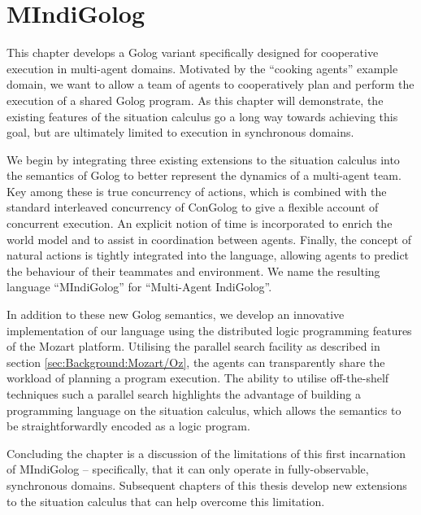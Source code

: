 

\chapter{MIndiGolog}

\label{ch:mindigolog}

This chapter develops a Golog variant specifically designed for cooperative
execution in multi-agent domains. Motivated by the {}``cooking agents''
example domain, we want to allow a team of agents to cooperatively
plan and perform the execution of a shared Golog program. As this
chapter will demonstrate, the existing features of the situation calculus
go a long way towards achieving this goal, but are ultimately limited
to execution in synchronous domains.

We begin by integrating three existing extensions to the situation
calculus into the semantics of Golog to better represent the dynamics
of a multi-agent team. Key among these is true concurrency of actions,
which is combined with the standard interleaved concurrency of ConGolog
to give a flexible account of concurrent execution. An explicit notion
of time is incorporated to enrich the world model and to assist in
coordination between agents. Finally, the concept of natural actions
is tightly integrated into the language, allowing agents to predict
the behaviour of their teammates and environment. We name the resulting
language {}``MIndiGolog'' for {}``Multi-Agent IndiGolog''.

In addition to these new Golog semantics, we develop an innovative
implementation of our language using the distributed logic programming
features of the Mozart platform. Utilising the parallel search facility
as described in section \ref{sec:Background:Mozart/Oz}, the agents
can transparently share the workload of planning a program execution.
The ability to utilise off-the-shelf techniques such a parallel search
highlights the advantage of building a programming language on the
situation calculus, which allows the semantics to be straightforwardly
encoded as a logic program.

Concluding the chapter is a discussion of the limitations of this
first incarnation of MIndiGolog -- specifically, that it can only
operate in fully-observable, synchronous domains. Subsequent chapters
of this thesis develop new extensions to the situation calculus that
can help overcome this limitation.

